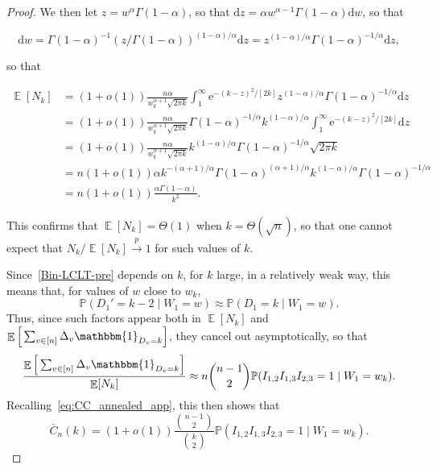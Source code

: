 \documentclass[ twocolumn,
 amsmath,amssymb,
 aps, pre, amsthm, amsfonts,
]{revtex4-2}
\DeclareMathOperator{\EX}{\mathbb{E}}%
\newcommand{\prob}{\mathbb{P}}
\newcommand{\nn}{\nonumber}
\begin{document}
\begin{proof}
We then let $z=w^{\alpha} \Gamma(1-\alpha)$, so that ${\mathrm d}z=\alpha w^{\alpha-1} \Gamma(1-\alpha) {\mathrm d}w$, so  that

\begin{equation}
    {\mathrm d}w=\Gamma(1-\alpha)^{-1} (z/\Gamma(1-\alpha))^{(1-\alpha)/\alpha}{\mathrm d}z=z^{(1-\alpha)/\alpha}\Gamma(1-\alpha)^{-1/\alpha}{\mathrm d}z,
\end{equation}

so that

\begin{align}
    \EX[N_k] &= (1+o(1))
	\frac{n\alpha }{w_k^{\alpha+1}\sqrt{2 \pi k}}\int_1^{\infty} 
	{\mathrm{e}}^{-(k-z)^2/[2k]} z^{(1-\alpha)/\alpha}\Gamma(1-\alpha)^{-1/\alpha}
	{\mathrm d}z\\
	&=(1+o(1))
	\frac{n\alpha }{w_k^{\alpha+1}\sqrt{2 \pi k}}\Gamma(1-\alpha)^{-1/\alpha}
	k^{(1-\alpha)/\alpha}\int_1^{\infty} {\mathrm{e}}^{-(k-z)^2/[2k]} {\mathrm d}z\nn\\
	&=(1+o(1))
	\frac{n\alpha}{w_k^{\alpha+1}\sqrt{2\pi k}} k^{(1-\alpha)/\alpha}\Gamma(1-\alpha)^{-1/\alpha} \sqrt{2\pi k} \nn\\
	&=n(1+o(1))\alpha k^{-(\alpha+1)/\alpha} \Gamma(1-\alpha)^{(\alpha+1)/\alpha} k^{(1-\alpha)/\alpha}\Gamma(1-\alpha)^{-1/\alpha} \nn\\
    & = n(1+o(1))\frac{\alpha \Gamma(1-\alpha)}{k^2}.\nn
\end{align}

This confirms that $\EX[N_k]=\Theta(1)$ when $k=\Theta(\sqrt{n})$, so that one cannot expect that $N_k/\EX[N_k]\overset{p}{\to} 1$ for such values of $k$. 

Since~\eqref{Bin-LCLT-pre} depends on $k$, for $k$ large, in a relatively weak way, this means that, for values of $w$ close to $w_k$,
\begin{equation}
    \prob(D_1'=k-2\mid W_1=w)\approx \prob(D_1=k\mid W_1=w).
\end{equation}
Thus, since such factors appear both in $\EX[N_k]$ and $\EX\Big[\sum_{v\in [n]}\Delta_v\mathbbm{1}_{D_v=k}\Big]$, they cancel out asymptotically, so that
\begin{equation}
    \frac{\EX\Big[\sum_{v\in [n]}\Delta_v\mathbbm{1}_{D_v=k}\Big]}{\EX[N_k]}
	\approx 
    n{{n-1}\choose{2}}\prob(I_{1,2}I_{1,3}I_{2,3}=1\mid W_1=w_k).
\end{equation}
Recalling~\eqref{eq:CC_annealed_app}, this then shows that
\begin{equation}
    \bar{C}_n(k)=(1+o(1)) \frac{{{n-1}\choose{2}}}{{{k}\choose{2}}} \prob(I_{1,2}I_{1,3}I_{2,3}=1\mid W_1=w_k).
\end{equation}


\end{proof}
\end{document}
